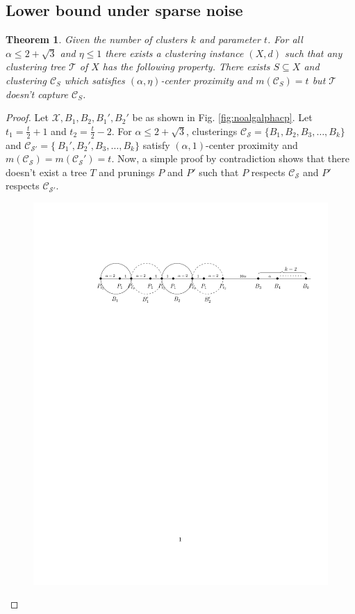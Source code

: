 \documentclass[12pt]{article}
\newtheorem{theorem}{Theorem}
\newcommand{\mc}{\mathcal}
\begin{document}
\subsection{Lower bound under sparse noise}
\label{section:alphaLowerBoundSparse}
\begin{theorem}
\label{thm:noalgalphacp}
Given the number of clusters $k$ and parameter $t$. For all $\alpha \le 2+\sqrt{3}$ and $\eta \le 1$ there exists a clustering instance $(X, d)$ such that any clustering tree $\mc T$ of $X$ has  the following property. There exists $S \subseteq X$ and clustering $\mc C_{S}$ which satisfies $(\alpha, \eta)$-center proximity and $ m(\mc C_{S}) = t$ but $\mc T$ doesn't capture $\mc C_{S}$.
\end{theorem}
\begin{proof}
Let $\mc X, B_1, B_2, B_1', B_2'$ be as shown in Fig. \ref{fig:noalgalphacp}. Let $t_1 = \frac{t}{2}+1$ and $t_2 = \frac{t}{2}-2$. For $\alpha \le 2+\sqrt{3}$, clusterings $\mc C_{\mc S} = \{B_1, B_2, B_3, \ldots, B_k\}$ and $\mc C_{\mc S'} = \{\ B_1', B_2', B_3, \ldots, B_k\}$ satisfy $(\alpha, 1)$-center proximity and $m(\mc C_{\mc S}) = m(\mc C_{\mc S}') = t$. Now, a simple proof by contradiction shows that there doesn't exist a tree $T$ and prunings $P$ and $P'$ such that $P$ respects $\mc C_{\mc S}$ and $P'$ respects $\mc C_{\mc S'}$.
\begin{figure}[!t]
\begin{center}
\includegraphics[trim={47mm 205mm 12mm 44mm},clip,width=\textwidth]{figures/clusteringNoise/lbdFig2.pdf}

\end{center}
\end{figure}
\end{proof}
\end{document}
